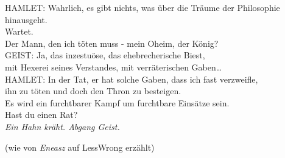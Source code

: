 {\begin{playdialog}
HAMLET: Wahrlich, es gibt nichts, was über die Träume der Philosophie hinausgeht.\\
Wartet.\\
Der Mann, den ich töten muss - mein Oheim, der König?\\


%
GEIST: Ja, das inzestuöse, das ehebrecherische Biest,\\
mit Hexerei seines Verstandes, mit verräterischen Gaben…\\

HAMLET: In der Tat, er hat solche Gaben, dass ich fast verzweifle,\\
ihn zu töten und doch den Thron zu besteigen.\\
Es wird ein furchtbarer Kampf um furchtbare Einsätze sein.\\
Hast du einen Rat?\\

\emph{Ein Hahn kräht. Abgang Geist.}

\end{playdialog}

(wie von \emph{Eneasz} auf LessWrong erzählt)

}

